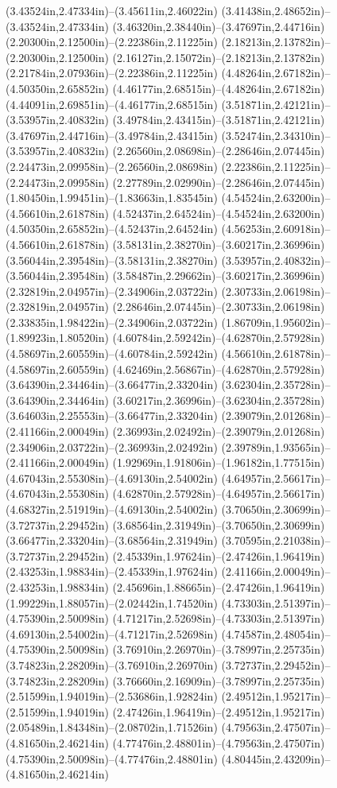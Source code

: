 (3.43524in,2.47334in)--(3.45611in,2.46022in) (3.41438in,2.48652in)--(3.43524in,2.47334in) (3.46320in,2.38440in)--(3.47697in,2.44716in) (2.20300in,2.12500in)--(2.22386in,2.11225in) (2.18213in,2.13782in)--(2.20300in,2.12500in) (2.16127in,2.15072in)--(2.18213in,2.13782in) (2.21784in,2.07936in)--(2.22386in,2.11225in) (4.48264in,2.67182in)--(4.50350in,2.65852in) (4.46177in,2.68515in)--(4.48264in,2.67182in) (4.44091in,2.69851in)--(4.46177in,2.68515in) (3.51871in,2.42121in)--(3.53957in,2.40832in) (3.49784in,2.43415in)--(3.51871in,2.42121in) (3.47697in,2.44716in)--(3.49784in,2.43415in) (3.52474in,2.34310in)--(3.53957in,2.40832in) (2.26560in,2.08698in)--(2.28646in,2.07445in) (2.24473in,2.09958in)--(2.26560in,2.08698in) (2.22386in,2.11225in)--(2.24473in,2.09958in) (2.27789in,2.02990in)--(2.28646in,2.07445in) (1.80450in,1.99451in)--(1.83663in,1.83545in) (4.54524in,2.63200in)--(4.56610in,2.61878in) (4.52437in,2.64524in)--(4.54524in,2.63200in) (4.50350in,2.65852in)--(4.52437in,2.64524in) (4.56253in,2.60918in)--(4.56610in,2.61878in) (3.58131in,2.38270in)--(3.60217in,2.36996in) (3.56044in,2.39548in)--(3.58131in,2.38270in) (3.53957in,2.40832in)--(3.56044in,2.39548in) (3.58487in,2.29662in)--(3.60217in,2.36996in) (2.32819in,2.04957in)--(2.34906in,2.03722in) (2.30733in,2.06198in)--(2.32819in,2.04957in) (2.28646in,2.07445in)--(2.30733in,2.06198in) (2.33835in,1.98422in)--(2.34906in,2.03722in) (1.86709in,1.95602in)--(1.89923in,1.80520in) (4.60784in,2.59242in)--(4.62870in,2.57928in) (4.58697in,2.60559in)--(4.60784in,2.59242in) (4.56610in,2.61878in)--(4.58697in,2.60559in) (4.62469in,2.56867in)--(4.62870in,2.57928in) (3.64390in,2.34464in)--(3.66477in,2.33204in) (3.62304in,2.35728in)--(3.64390in,2.34464in) (3.60217in,2.36996in)--(3.62304in,2.35728in) (3.64603in,2.25553in)--(3.66477in,2.33204in) (2.39079in,2.01268in)--(2.41166in,2.00049in) (2.36993in,2.02492in)--(2.39079in,2.01268in) (2.34906in,2.03722in)--(2.36993in,2.02492in) (2.39789in,1.93565in)--(2.41166in,2.00049in) (1.92969in,1.91806in)--(1.96182in,1.77515in) (4.67043in,2.55308in)--(4.69130in,2.54002in) (4.64957in,2.56617in)--(4.67043in,2.55308in) (4.62870in,2.57928in)--(4.64957in,2.56617in) (4.68327in,2.51919in)--(4.69130in,2.54002in) (3.70650in,2.30699in)--(3.72737in,2.29452in) (3.68564in,2.31949in)--(3.70650in,2.30699in) (3.66477in,2.33204in)--(3.68564in,2.31949in) (3.70595in,2.21038in)--(3.72737in,2.29452in) (2.45339in,1.97624in)--(2.47426in,1.96419in) (2.43253in,1.98834in)--(2.45339in,1.97624in) (2.41166in,2.00049in)--(2.43253in,1.98834in) (2.45696in,1.88665in)--(2.47426in,1.96419in) (1.99229in,1.88057in)--(2.02442in,1.74520in) (4.73303in,2.51397in)--(4.75390in,2.50098in) (4.71217in,2.52698in)--(4.73303in,2.51397in) (4.69130in,2.54002in)--(4.71217in,2.52698in) (4.74587in,2.48054in)--(4.75390in,2.50098in) (3.76910in,2.26970in)--(3.78997in,2.25735in) (3.74823in,2.28209in)--(3.76910in,2.26970in) (3.72737in,2.29452in)--(3.74823in,2.28209in) (3.76660in,2.16909in)--(3.78997in,2.25735in) (2.51599in,1.94019in)--(2.53686in,1.92824in) (2.49512in,1.95217in)--(2.51599in,1.94019in) (2.47426in,1.96419in)--(2.49512in,1.95217in) (2.05489in,1.84348in)--(2.08702in,1.71526in) (4.79563in,2.47507in)--(4.81650in,2.46214in) (4.77476in,2.48801in)--(4.79563in,2.47507in) (4.75390in,2.50098in)--(4.77476in,2.48801in) (4.80445in,2.43209in)--(4.81650in,2.46214in) 
